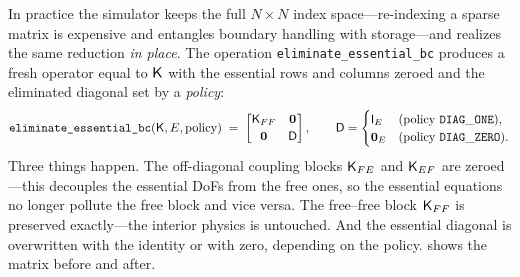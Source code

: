 In practice the simulator keeps the full $N\times N$ index space---re-indexing a
sparse matrix is expensive and entangles boundary handling with storage---and
realizes the same reduction \emph{in place}. The operation
\texttt{eliminate\_essential\_bc} produces a fresh operator equal to $\mathsf{K}$
with the essential rows and columns zeroed and the eliminated diagonal set by a
\emph{policy}:
\begin{equation}
  \texttt{eliminate\_essential\_bc}(\mathsf{K},E,\text{policy})
  \;=\;
  \begin{bmatrix} \mathsf{K}_{FF} & \mathbf{0} \\[2pt]
                  \mathbf{0} & \mathsf{D} \end{bmatrix},
  \qquad
  \mathsf{D} =
  \begin{cases}
    \mathsf{I}_E & \text{(policy } \mathtt{DIAG\_ONE}),\\
    \mathbf{0}_E & \text{(policy } \mathtt{DIAG\_ZERO}).
  \end{cases}
  \label{eq:elim}
\end{equation}
Three things happen. The off-diagonal coupling blocks $\mathsf{K}_{FE}$ and
$\mathsf{K}_{EF}$ are zeroed---this decouples the essential DoFs from the free ones,
so the essential equations no longer pollute the free block and vice versa. The
free--free block $\mathsf{K}_{FF}$ is preserved exactly---the interior physics is
untouched. And the essential diagonal is overwritten with the identity or with
zero, depending on the policy.  shows the matrix before and after.

